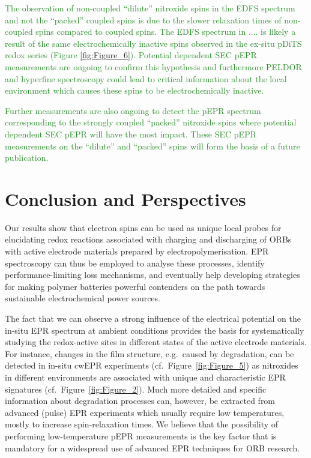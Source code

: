 \documentclass{WileyMSP-template}
\newcommand{\np}[1]{\textcolor{ForestGreen}{#1}}
\begin{document}
\bigbreak

\np{The observation of non-coupled “dilute” nitroxide spins in the EDFS spectrum and not the “packed” coupled spins is due to the slower relaxation times of non-coupled spins compared to coupled spins. The EDFS spectrum in .... is likely a result of the same electrochemically inactive spins observed in the ex-situ pDiTS redox series (Figure \ref{fig:Figure_6}). Potential dependent SEC pEPR measurements are ongoing to confirm this hypothesis and furthermore PELDOR and hyperfine spectroscopy could lead to critical information about the local environment which causes these spins to be electrochemically inactive.}

\bigbreak

\np{Further measurements are also ongoing to detect the pEPR spectrum corresponding to the strongly coupled “packed” nitroxide spins where potential dependent SEC pEPR will have the most impact. These SEC pEPR measurements on the “dilute” and “packed” spins will form the basis of a future publication.}


\section{Conclusion and Perspectives}
Our results show that electron spins can be used as unique local probes for elucidating redox reactions associated with charging and discharging of ORBs with active electrode materials prepared by electropolymerisation. EPR spectroscopy can thus be employed to analyse these processes, identify performance-limiting loss mechanisms, and eventually help developing strategies for making polymer batteries powerful contenders on the path towards sustainable electrochemical power sources. 


\bigbreak

The fact that we can observe a strong influence of the electrical potential on the in-situ EPR spectrum at ambient conditions provides the basis for systematically studying the redox-active sites in different states of the active electrode materials. For instance, changes in the film structure, e.g.\ caused by degradation, can be detected in in-situ cwEPR experiments (cf.\ Figure~\ref{fig:Figure_5}) as nitroxides in different environments are associated with unique and characteristic EPR signatures (cf.\ Figure~\ref{fig:Figure_2}). Much more detailed and specific information about degradation processes can, however, be extracted from advanced (pulse) EPR experiments which usually require low temperatures, mostly to increase spin-relaxation times. We believe that the possibility of performing low-temperature pEPR measurements is the key factor that is mandatory for a widespread use of advanced EPR techniques for ORB research.\\
\end{document}
